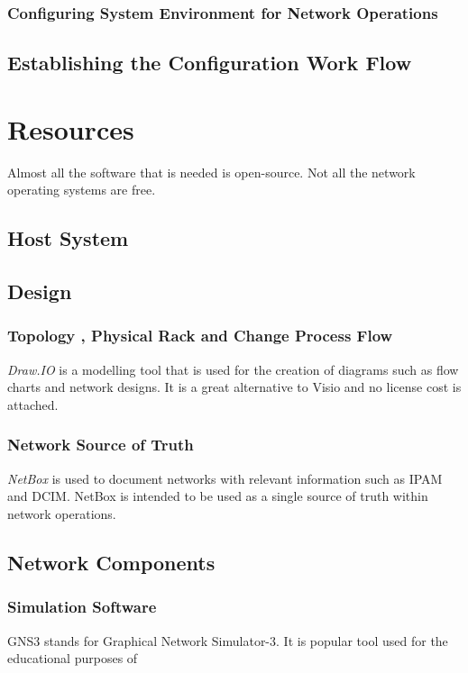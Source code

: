 \documentclass[12pt, letterpaper]{article}
\begin{document}
	\subsubsection{Configuring System Environment for Network Operations}

	\subsection{Establishing the Configuration Work Flow}

	
		
		

\newpage

\section{Resources}

Almost all the software that is needed is open-source. Not all the network operating systems are free.
	
	\subsection{Host System}
	
	\subsection{Design}
	
		\subsubsection{Topology , Physical Rack and Change Process Flow}
\textit{Draw.IO} is a modelling tool that is used for the creation of diagrams such as flow charts and network designs. It is a great alternative to Visio and no license cost is attached.

		\subsubsection{Network Source of Truth}
\textit{NetBox} is used to document networks with relevant information such as IPAM and DCIM. NetBox is intended to be used as a single source of truth within network operations.
	
	\subsection{Network Components}
		\subsubsection{Simulation Software}
GNS3 stands for Graphical Network Simulator-3. It is popular tool used for the educational purposes of 
\end{document}

